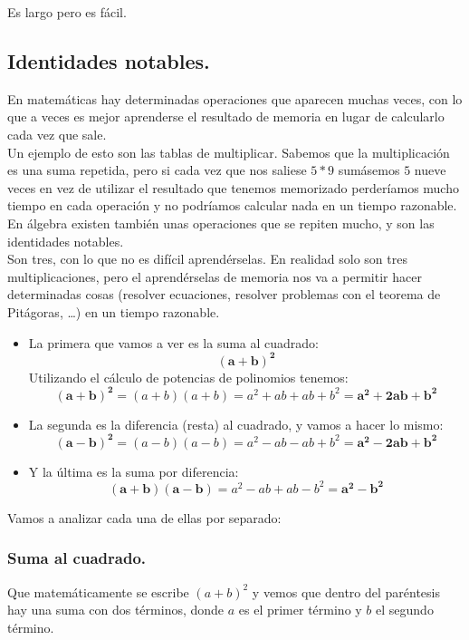 \documentclass[a4paper,11pt,answers]{exam}
\begin{document}
  Es largo pero es fácil.

  \subsection{Identidades notables.}
  En matemáticas hay determinadas operaciones que aparecen muchas veces, con lo que a veces es mejor aprenderse el resultado de memoria en lugar de calcularlo cada vez que sale.\\
  Un ejemplo de esto son las tablas de multiplicar. Sabemos que la multiplicación es una suma repetida, pero si cada vez que nos saliese $5*9$ sumásemos $5$ nueve veces en vez de utilizar el resultado que tenemos memorizado perderíamos mucho tiempo en cada operación y no podríamos calcular nada en un tiempo razonable.\\

  En álgebra existen también unas operaciones que se repiten mucho, y son las identidades notables.\\

  Son tres, con lo que no es difícil aprendérselas. En realidad solo son tres multiplicaciones, pero el aprendérselas de memoria nos va a permitir hacer determinadas cosas (resolver ecuaciones, resolver problemas con el teorema de Pitágoras, \dots) en un tiempo razonable.
  \begin{itemize}
  \item La primera que vamos a ver es la suma al cuadrado:
    \[\boldsymbol{(a+b)^2}\]
    Utilizando el cálculo de potencias de polinomios tenemos:
    \[\boldsymbol{(a+b)^2} = (a+b)(a+b) = a^2 + ab + ab + b^2 = \boldsymbol{a^2 + 2ab + b^2}\]
  \item La segunda es la diferencia (resta) al cuadrado, y vamos a hacer lo mismo:
    \[\boldsymbol{(a-b)^2} = (a-b)(a-b) = a^2 - ab - ab + b^2 = \boldsymbol{a^2 - 2ab + b^2}\]
  \item Y la última es la suma por diferencia:
    \[\boldsymbol{(a+b)(a-b)} = a^2 -ab + ab - b^2 = \boldsymbol{a^2 - b^2}\]
  \end{itemize}

  Vamos a analizar cada una de ellas por separado:
  \subsubsection{Suma al cuadrado.}
  Que matemáticamente se escribe $(a + b)^2$ y vemos que dentro del paréntesis hay una suma con dos términos, donde $a$ es el primer término y $b$ el segundo término.\\
\end{document}
